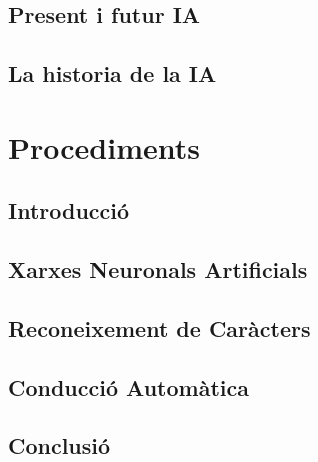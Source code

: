 \documentclass[a4paper,12pt]{report}
\begin{document}
\chapter{Present i futur IA}


\chapter{La historia de la IA}


\part{Procediments}

\chapter{Introducció}


\chapter{Xarxes Neuronals Artificials}


\chapter{Reconeixement de Caràcters}


\chapter{Conducció Automàtica}


\chapter{Conclusió}


\printbibliography
\end{document}
